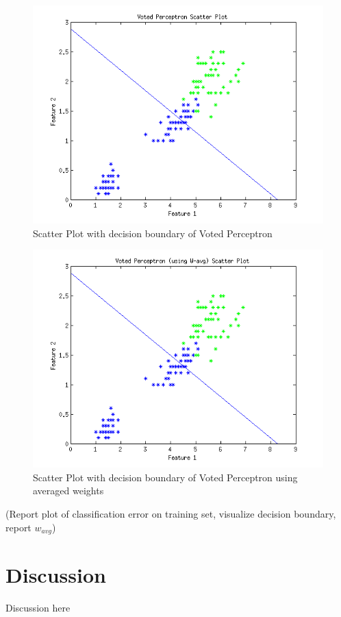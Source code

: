 \documentclass[12pt]{article}
\begin{document}
\begin{figure}[htbp]
  \includegraphics{img/voted_scatterplot.png}
  \caption{Scatter Plot with decision boundary of Voted Perceptron}
\end{figure}

\begin{figure}[htbp]
  \includegraphics{img/voted_avg_scatterplot.png}
  \caption{Scatter Plot with decision boundary of Voted Perceptron using  averaged weights}
\end{figure}

(Report plot of classification error on training set, visualize decision boundary, report \(w_{avg}\))



\section{Discussion}
Discussion here
\end{document}
